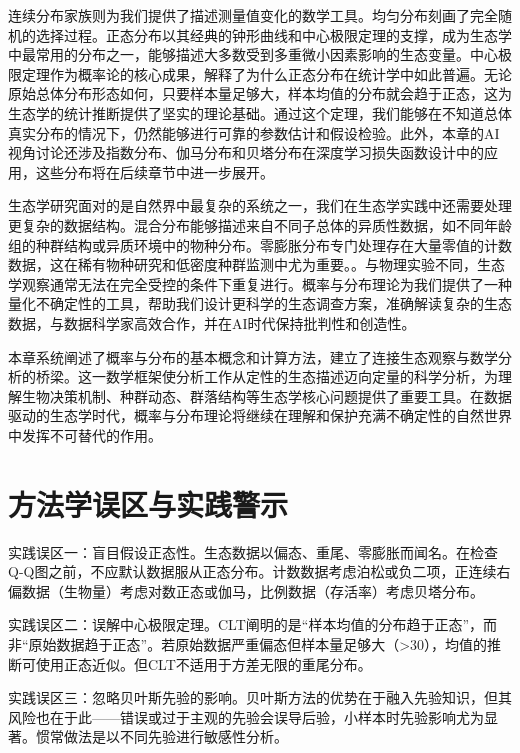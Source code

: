\documentclass[
  twoside,12pt,fontset=none]{ctexbook}
\begin{document}
连续分布家族则为我们提供了描述测量值变化的数学工具。均匀分布刻画了完全随机的选择过程。正态分布以其经典的钟形曲线和中心极限定理的支撑，成为生态学中最常用的分布之一，能够描述大多数受到多重微小因素影响的生态变量。中心极限定理作为概率论的核心成果，解释了为什么正态分布在统计学中如此普遍。无论原始总体分布形态如何，只要样本量足够大，样本均值的分布就会趋于正态，这为生态学的统计推断提供了坚实的理论基础。通过这个定理，我们能够在不知道总体真实分布的情况下，仍然能够进行可靠的参数估计和假设检验。此外，本章的AI视角讨论还涉及指数分布、伽马分布和贝塔分布在深度学习损失函数设计中的应用，这些分布将在后续章节中进一步展开。

生态学研究面对的是自然界中最复杂的系统之一，我们在生态学实践中还需要处理更复杂的数据结构。混合分布能够描述来自不同子总体的异质性数据，如不同年龄组的种群结构或异质环境中的物种分布。零膨胀分布专门处理存在大量零值的计数数据，这在稀有物种研究和低密度种群监测中尤为重要。。与物理实验不同，生态学观察通常无法在完全受控的条件下重复进行。概率与分布理论为我们提供了一种量化不确定性的工具，帮助我们设计更科学的生态调查方案，准确解读复杂的生态数据，与数据科学家高效合作，并在AI时代保持批判性和创造性。

本章系统阐述了概率与分布的基本概念和计算方法，建立了连接生态观察与数学分析的桥梁。这一数学框架使分析工作从定性的生态描述迈向定量的科学分析，为理解生物决策机制、种群动态、群落结构等生态学核心问题提供了重要工具。在数据驱动的生态学时代，概率与分布理论将继续在理解和保护充满不确定性的自然世界中发挥不可替代的作用。

\hypertarget{ux65b9ux6cd5ux5b66ux8befux533aux4e0eux5b9eux8df5ux8b66ux793a-1}{%
\section{方法学误区与实践警示}\label{ux65b9ux6cd5ux5b66ux8befux533aux4e0eux5b9eux8df5ux8b66ux793a-1}}

实践误区一：盲目假设正态性。生态数据以偏态、重尾、零膨胀而闻名。在检查Q-Q图之前，不应默认数据服从正态分布。计数数据考虑泊松或负二项，正连续右偏数据（生物量）考虑对数正态或伽马，比例数据（存活率）考虑贝塔分布。

实践误区二：误解中心极限定理。CLT阐明的是``样本均值的分布趋于正态''，而非``原始数据趋于正态''。若原始数据严重偏态但样本量足够大（\textgreater30），均值的推断可使用正态近似。但CLT不适用于方差无限的重尾分布。

实践误区三：忽略贝叶斯先验的影响。贝叶斯方法的优势在于融入先验知识，但其风险也在于此------错误或过于主观的先验会误导后验，小样本时先验影响尤为显著。惯常做法是以不同先验进行敏感性分析。
\end{document}
